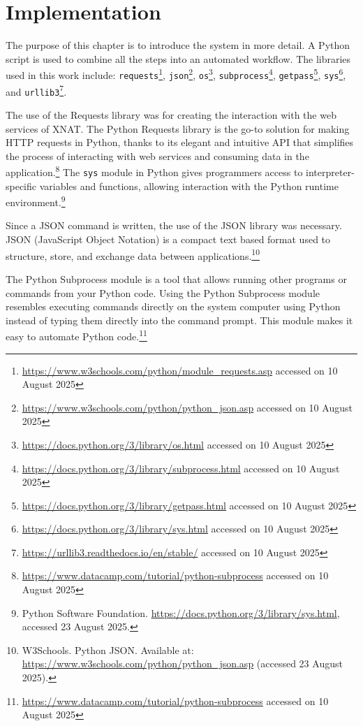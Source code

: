 

\chapter{Implementation}

The purpose of this chapter is to introduce the system in more detail. A Python script is used to combine all the steps into an automated workflow. The libraries used in this work include: \texttt{requests}\footnote{\url{https://www.w3schools.com/python/module_requests.asp} accessed on 10 August 2025}, \texttt{json}\footnote{\url{https://www.w3schools.com/python/python_json.asp} accessed on 10 August 2025}, \texttt{os}\footnote{\url{https://docs.python.org/3/library/os.html} accessed on 10 August 2025}, \texttt{subprocess}\footnote{\url{https://docs.python.org/3/library/subprocess.html} accessed on 10 August 2025}, \texttt{getpass}\footnote{\url{https://docs.python.org/3/library/getpass.html} accessed on 10 August 2025}, \texttt{sys}\footnote{\url{https://docs.python.org/3/library/sys.html} accessed on 10 August 2025}, and \texttt{urllib3}\footnote{\url{https://urllib3.readthedocs.io/en/stable/} accessed on 10 August 2025}.

The use of the Requests library was for creating the interaction with the web services of XNAT. The Python Requests library is the go-to solution for making HTTP requests in Python, thanks to its elegant and intuitive API that simplifies the process of interacting with web services and consuming data in the application.\footnote{\url{https://www.datacamp.com/tutorial/python-subprocess} accessed on 10 August 2025} 
The \texttt{sys} module in Python gives programmers access to interpreter-specific variables and functions, allowing interaction with the Python runtime environment.\footnote{Python Software Foundation. \url{https://docs.python.org/3/library/sys.html}, accessed 23 August 2025.}




Since a JSON command is written, the use of the JSON library was necessary. 
JSON (JavaScript Object Notation) is a compact text based
 format used to structure, store, and exchange data between applications.\footnote{W3Schools. Python JSON. Available at: \url{https://www.w3schools.com/python/python_json.asp} (accessed 23 August 2025).}

The Python Subprocess module is a tool that allows running other programs or commands from your Python code. Using the Python Subprocess module resembles executing commands directly on the system computer using Python instead of typing them directly into the command prompt. This module makes it easy to automate Python code.\footnote{\url{https://www.datacamp.com/tutorial/python-subprocess} accessed on 10 August 2025}

